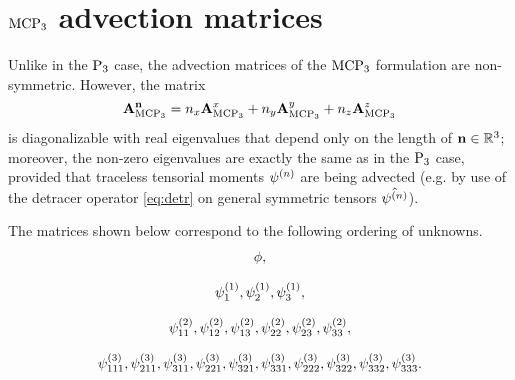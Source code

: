 \chapter{$\MCPN[3]$ advection matrices}\label{app:D}
Unlike in the $\PN[3]$ case, the advection matrices of the $\MCPN[3]$ formulation are non-symmetric. However,  the
matrix 
$$
\mat{A}_{\MCPN[3]}^{\bn} = n_x \mat{A}_{\MCPN[3]}^x + n_y \mat{A}_{\MCPN[3]}^y + n_z \mat{A}_{\MCPN[3]}^z
$$
is diagonalizable with real eigenvalues that depend only on the length of $\bn\in\R[3]$; moreover, the non-zero
eigenvalues are exactly the same as in the $\PN[3]$ case, provided that traceless tensorial moments $\fmom$ are being advected (e.g. by use of
the detracer operator \eqref{eq:detr} on general symmetric tensors $\hat\fmom$).

The matrices shown below correspond to the following ordering of unknowns.
$$
\begin{gathered}
\phi,\\[.75em]
\fmom[1]_{1},\fmom[1]_{2},\fmom[1]_{3},\\[.75em]
\fmom[2]_{11},\fmom[2]_{12},\fmom[2]_{13},\fmom[2]_{22},\fmom[2]_{23},\fmom[2]_{33},\\[.75em]
\fmom[3]_{111},\fmom[3]_{211},\fmom[3]_{311},\fmom[3]_{221},\fmom[3]_{321},\fmom[3]_{331},\fmom[3]_{222},\fmom[3]_{322},\fmom[3]_{332},\fmom[3]_{333}.
\end{gathered}
$$

